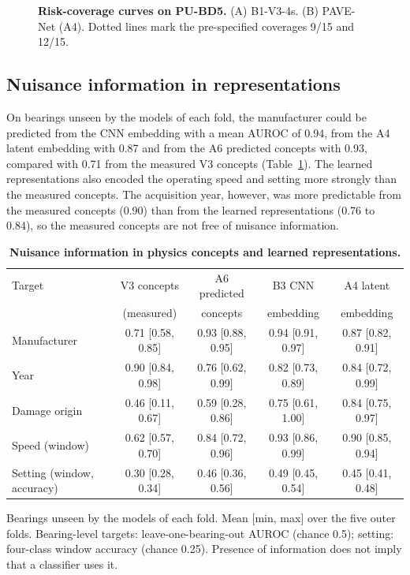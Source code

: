 \documentclass[10pt,letterpaper]{article}
\begin{document}
\begin{figure}[!h]
\caption{\textbf{Risk-coverage curves on PU-BD5.} (A) B1-V3-4s. (B) PAVE-Net (A4). Dotted lines mark the pre-specified coverages 9/15 and 12/15.}
\label{fig6}
\end{figure}

\subsection*{Nuisance information in representations}
On bearings unseen by the models of each fold, the manufacturer could be predicted from the CNN embedding with a mean AUROC of 0.94, from the A4 latent embedding with 0.87 and from the A6 predicted concepts with 0.93, compared with 0.71 from the measured V3 concepts (Table~\ref{tab:probes}). The learned representations also encoded the operating speed and setting more strongly than the measured concepts. The acquisition year, however, was more predictable from the measured concepts (0.90) than from the learned representations (0.76 to 0.84), so the measured concepts are not free of nuisance information.

\begin{table}[!ht]
\centering
\caption{\textbf{Nuisance information in physics concepts and learned representations.}}
{\footnotesize
\setlength{\tabcolsep}{4pt}
\renewcommand{\arraystretch}{1.25}
\begin{tabular}{lcccc}
\hline
Target & V3 concepts & A6 predicted & B3 CNN & A4 latent \\
 & (measured) & concepts & embedding & embedding \\
\hline
Manufacturer & 0.71 [0.58, 0.85] & 0.93 [0.88, 0.95] & 0.94 [0.91, 0.97] & 0.87 [0.82, 0.91] \\
Year & 0.90 [0.84, 0.98] & 0.76 [0.62, 0.99] & 0.82 [0.73, 0.89] & 0.84 [0.72, 0.99] \\
Damage origin & 0.46 [0.11, 0.67] & 0.59 [0.28, 0.86] & 0.75 [0.61, 1.00] & 0.84 [0.75, 0.97] \\
Speed (window) & 0.62 [0.57, 0.70] & 0.84 [0.72, 0.96] & 0.93 [0.86, 0.99] & 0.90 [0.85, 0.94] \\
Setting (window, accuracy) & 0.30 [0.28, 0.34] & 0.46 [0.36, 0.56] & 0.49 [0.45, 0.54] & 0.45 [0.41, 0.48] \\
\hline
\end{tabular}}
\begin{flushleft} Bearings unseen by the models of each fold. Mean [min, max] over the five outer folds. Bearing-level targets: leave-one-bearing-out AUROC (chance 0.5); setting: four-class window accuracy (chance 0.25). Presence of information does not imply that a classifier uses it. \end{flushleft}
\label{tab:probes}
\end{table}
\end{document}
